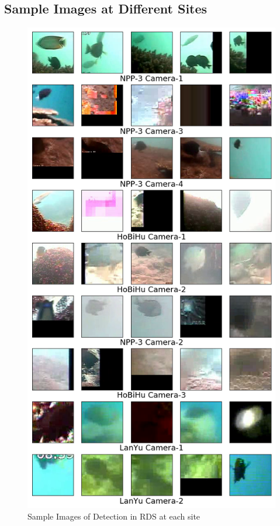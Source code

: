\documentclass[bsc,logo,twoside,fullspacing,parskip]{infthesis}
\begin{document}
\subsection{Sample Images at Different Sites}

\begin{figure}[h]
    \centering
    \includegraphics[scale=0.4]{graph/samplesite2.png}
    \caption{Sample Images of Detection in RDS at each site}
    \label{fig:samplesite}
\end{figure}
\end{document}
